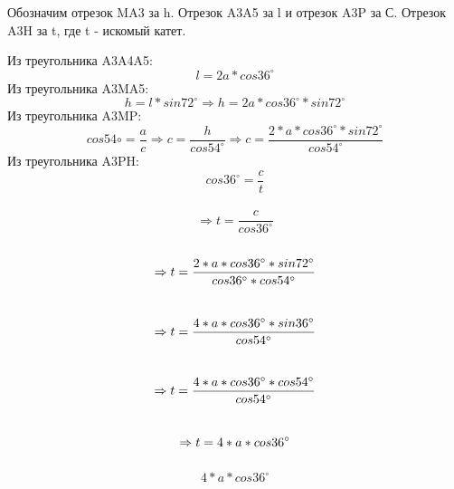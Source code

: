 \solutionSection

Обозначим отрезок MA3 за h. Отрезок A3A5 за l и отрезок A3P за С. Отрезок A3H за t, где t - искомый катет.


Из треугольника A3A4A5:\\
\begin{displaymath} l= 2a*cos36^{\circ} \end{displaymath}
Из треугольника A3MA5:\\
\begin{displaymath} h= l*sin72^{\circ}
\Rightarrow
h= 2a*cos36^{\circ} *sin72^{\circ} 
\end{displaymath}
Из треугольника A3MP: 
\begin{displaymath} 
cos54{\circ}= \frac{a}{c}
\Rightarrow
c = \frac{h}{cos54^{\circ}}
\Rightarrow
c = \frac{2*a*cos36^{\circ}*sin72^{\circ}}{cos54^{\circ}}
\end{displaymath}
Из треугольника A3PH: \\
\begin{displaymath} 
cos36^{\circ} = \frac{c}{t} 
\end{displaymath} \\
\begin{displaymath} 
\Rightarrow
t =  \frac{c}{cos36^{\circ}}
\end{displaymath}\\
\begin{displaymath} 
\Rightarrow
t =  \frac{2*a*cos36^{\circ}* sin72^{\circ} }{cos36^{\circ}*cos54^{\circ}}\\
\end{displaymath}\\
\begin{displaymath} 
\Rightarrow
t =  \frac{4*a*cos36^{\circ}*sin36^{\circ} }{cos54^{\circ}}\\
\end{displaymath}\\
\begin{displaymath} 
\Rightarrow
t =  \frac{4*a*cos36^{\circ}*cos54^{\circ} }{cos54^{\circ}}\\
\end{displaymath} \\
\begin{displaymath} 
\Rightarrow
t = 4*a*cos36^{\circ}\\
\end{displaymath}\\

\begin{displaymath} 4*a*cos36^{\circ}\end{displaymath}